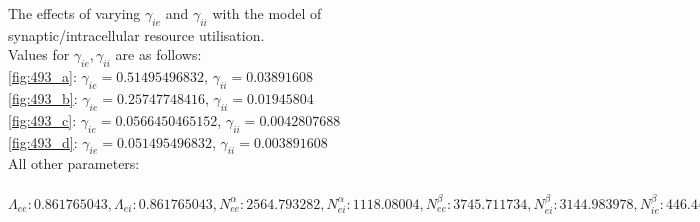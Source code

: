 \documentclass[a4paper,12pt]{article}
\begin{document}
\begin{figure}
	\label{fig:intra_gamma}
	\caption{The effects of varying $\gamma_{ie}$ and $\gamma_{ii}$ with the model of synaptic/intracellular resource utilisation. \\
	Values for $\gamma_{ie}, \gamma_{ii}$ are as follows: \\
\ref{fig:493_a}: $\gamma_{ie}=0.51495496832$, $\gamma_{ii}=0.03891608$ \\
\ref{fig:493_b}: $\gamma_{ie}=0.25747748416$, $\gamma_{ii}=0.01945804$ \\
\ref{fig:493_c}: $\gamma_{ie}=0.0566450465152$, $\gamma_{ii}=0.0042807688$ \\
\ref{fig:493_d}: $\gamma_{ie}=0.051495496832$, $\gamma_{ii}=0.003891608$ \\
All other parameters:\\ \\
$\Lambda_{ee}: 0.861765043, \Lambda_{ei}: 0.861765043, N^{\alpha}_{ee}: 2564.793282, N^{\alpha}_{ei}: 1118.08004, N^{\beta}_{ee}: 3745.711734, N^{\beta}_{ei}: 3144.983978, N^{\beta}_{ie}: 446.4477283, N^{\beta}_{ii}: 345.8866865, \Gamma_{ee}: 1.6861042005, \Gamma_{ei}: 1.885871361, \hat{\Gamma_{ie}}: 5.855116285, \hat{\Gamma_{ii}}: 6.9331585350000005, g: 0.7, \gamma_{ee}: 0.95083473, \gamma_{ei}: 0.79156622, \chi_{ee}: 700.0, \chi_{ei}: 700.0, h^{rest}_e: -79.61058688, h^{eq}_{ee}: -17.9914286, h^{eq}_{ei}: -15.53827744, h^{rest}_i: -71.24328917, h^{eq}_{ie}: -84.00936425, h^{eq}_{ii}: -89.797995, \mu_e: -41.12042539, \mu_i: -54.45064422, p_{ee}: 2.6864898634, p_{ei}: 6.648040185, p_{ie}: 0.0, p_{ii}: 0.0, \phi_{ie}: 0, \phi_{ii}: 0, r^{abs}: 0.0, S^{max}_e: 0.400558, S^{max}_i: 0.404191, \sigma_e: 6.55747395, \sigma_i: 2.047597811, \tau_e: 108.758, \tau_i: 232.0, \tau^{slow}_e: 5437.9, v: 0.419426$
}
\end{figure}
\end{document}
